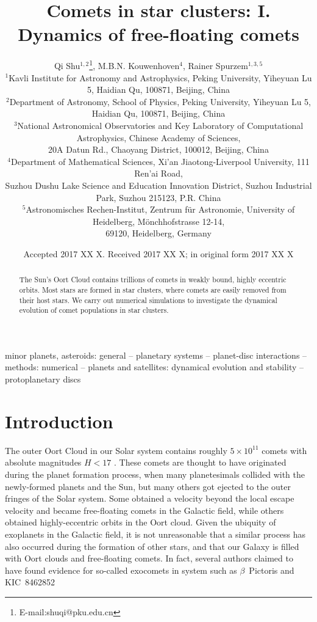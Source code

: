 \documentclass[usenatbib]{mnras}
\title[Comets in star clusters: I. Dynamics of free-floating comets]{Comets in star clusters: I. Dynamics of free-floating comets}
\author[Qi Shu et al.]{Qi Shu$^{1,2}$\thanks{E-mail:shuqi@pku.edu.cn}, M.B.N. Kouwenhoven$^{4}$, Rainer Spurzem$^{1,3,5}$\\
  $^{1}$Kavli Institute for Astronomy and Astrophysics, Peking University, Yiheyuan Lu 5, Haidian Qu, 100871, Beijing, China\\
  $^{2}$Department of Astronomy, School of Physics, Peking University, Yiheyuan Lu 5, Haidian Qu, 100871, Beijing, China\\
  $^{3}$National Astronomical Observatories and Key Laboratory of Computational Astrophysics, Chinese Academy of Sciences, \\
  20A Datun Rd., Chaoyang District, 100012, Beijing, China\\ 
  $^{4}$Department of Mathematical Sciences, Xi'an Jiaotong-Liverpool University, 111 Ren'ai Road, \\
  Suzhou Dushu Lake Science and Education Innovation District, Suzhou Industrial Park, Suzhou 215123, P.R. China \\
  $^{5}$Astronomisches Rechen-Institut, Zentrum f\"ur Astronomie, University of Heidelberg, M\"onchhofstrasse 12-14, \\
69120, Heidelberg, Germany \\
}
\begin{document}
\date{Accepted 2017 XX X. Received 2017 XX X; in original form 2017 XX X}

  

\maketitle

\label{firstpage}

\begin{abstract}
The Sun's Oort Cloud contains trillions of comets in weakly bound, highly eccentric orbits. Most stars are formed in star clusters, where comets are easily removed from their host stars. We carry out numerical simulations to investigate the dynamical evolution of comet populations in star clusters.


\end{abstract}

\begin{keywords}
minor planets, asteroids: general -- planetary systems -- planet-disc interactions -- methods: numerical -- planets and satellites: dynamical evolution and stability -- protoplanetary discs
\end{keywords}

\section{Introduction}

The outer Oort Cloud in our Solar system contains roughly $5 \times10^{11}$ comets with absolute magnitudes $H < 17$ \citep{Francis:2005aa}. These comets are thought to have originated during the planet formation process, when many planetesimals collided with the newly-formed planets and the Sun, but many others got ejected to the outer fringes of the Solar system. Some obtained a velocity beyond the local escape velocity and became free-floating comets in the Galactic field, while others obtained highly-eccentric orbits in the Oort cloud. Given the ubiquity of exoplanets in the Galactic field, it is not unreasonable that a similar process has also occurred during the formation of other stars, and that our Galaxy is filled with Oort clouds and free-floating comets. In fact, several authors claimed to have found evidence for so-called exocomets in system such as $\beta$~Pictoris \citep[e.g.,][and references therein]{Welsh:2016aa} and KIC~8462852 \citep[e.g.,][and references therein]{Bodman:2016aa, Boyajian:2016aa}
\end{document}
